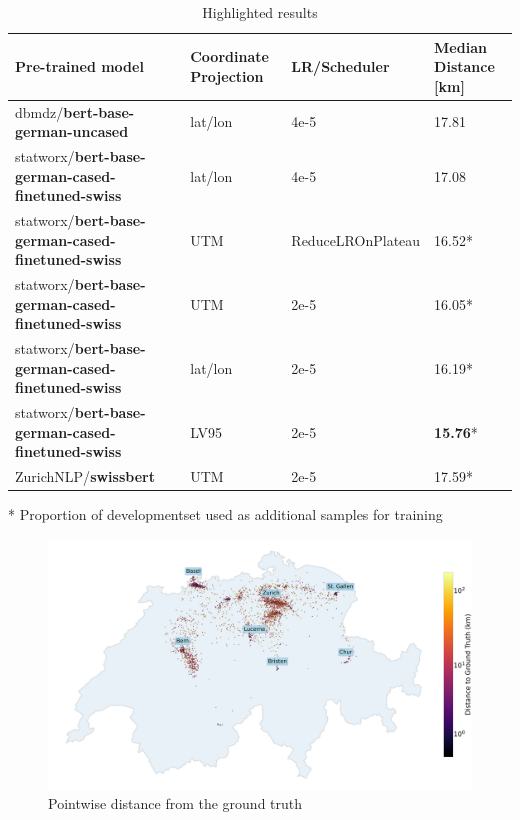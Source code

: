 \begin{table}
    \centering
    \begin{tabular}{p{}|p{}|p{}|p{}}
        \toprule
        Pre-trained model                                        & Coordinate Projection & LR/Scheduler      & Median Distance [km] \\
        \midrule
        dbmdz/\textbf{bert-base-german-uncased}                  & lat/lon               & 4e-5              & 17.81                \\
        statworx/\textbf{bert-base-german-cased-finetuned-swiss} & lat/lon               & 4e-5              & 17.08                \\
        statworx/\textbf{bert-base-german-cased-finetuned-swiss} & UTM                   & ReduceLROnPlateau & 16.52*               \\
        statworx/\textbf{bert-base-german-cased-finetuned-swiss} & UTM                   & 2e-5              & 16.05*               \\
        statworx/\textbf{bert-base-german-cased-finetuned-swiss} & lat/lon               & 2e-5              & 16.19*               \\
        statworx/\textbf{bert-base-german-cased-finetuned-swiss} & LV95                  & 2e-5              & \textbf{15.76}*      \\
        ZurichNLP/\textbf{swissbert}                             & UTM                   & 2e-5              & 17.59*               \\
        \bottomrule
    \end{tabular}
    \caption{Highlighted results}
    \bigskip
    \raggedright
    * Proportion of developmentset used as additional samples for training \\
    \label{tbl:highlighted-results}
\end{table}

\begin{figure}
    \centering
    \includegraphics[width=\textwidth]{./figs/dotmap.png}
    \caption{Pointwise distance from the ground truth}
    \label{fig:pointwise-distance}
\end{figure}

